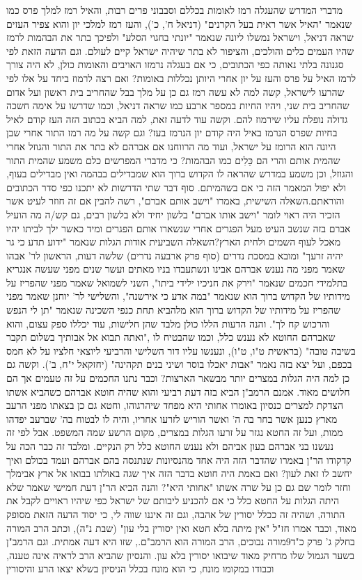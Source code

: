 \documentclass[12pt, openany]{book}
\begin{document}
מדברי המדרש שהעגלה רמז לאומות בכללם וסבבוני פרים רבות, והאיל רמז למלך פרס כמו שנאמר "האיל אשר ראית בעל הקרנים" (דניאל ח', כ'), והעז רמז למלכי יון והוא צפיר העזים שראה דניאל, וישראל נמשלו ליונה שנאמר "יונתי בחגוי הסלע" ולפיכך בתר את הבהמות לרמז שהיו העמים כלים והולכים, והציפור לא בתר שיהיה ישראל קיים לעולם. וגם הדעה הזאת לפי סגנונה בלתי נאותה כפי הכתובים, כי אם בעגלה נרמזו האויבים והאומות כולן, לא היה צורך לרמז האיל על פרס והעז על יון אחרי היותן נכללות באומות? ואם רצה לרמוז ביחד על אלו לפי שהרעו לישראל, קשה למה לא עשה רמז גם כן על מלך בבל שהחריב בית ראשון ועל אדום שהחריב בית שני, ויהיו החיות במספר ארבע כמו שראה דניאל, וכמו שדרשו על אימה חשכה גדולה נופלת עליו שירמוז להם. וקשה עוד לדעה זאת, למה הביא בכתוב הזה העז קודם לאיל בחיות שפרס הנרמז באיל היה קודם יון הנרמז בעז? וגם קשה על מה רמז התור אחרי שבן היונה הוא הרומז על ישראל, ועוד מה הרווחנו אם אברהם לא בתר את התור והגוזל אחרי שהמית אותם והרי הם כַּלִים כמו הבהמות? כי מדברי המפרשים כלם משמע שהמית התור והגוזל, וכן משמע במדרש שהראה לו הקדוש ברוך הוא שמבדילים בבהמה ואין מבדילים בעוף, ולא יפול המאמר הזה כי אם בשהמיתם. סוף דבר שתי הדרשות לא יתכנו כפי סדר הכתובים והוראתם.השאלה השישית, באמרו "וישב אותם אברם", רשה להבין אם זה חוזר לעיט אשר הזכיר היה ראוי לומר "וישב אותו אברם" בלשון יחיד ולא בלשון רבים, גם קש/ה מה הועיל אברם בזה שנשב העיט מעל הפגרים אחרי שנשארו אותם הפגרים ומיד כאשר ילך לביתו יהיו מאכל לעוף השמים ולחית הארץ?השאלה השביעית אודות הגלות שנאמר "ידוע תדע כי גר יהיה זרעך" ומובא במסכת נדרים (סוף פרק ארבעה נדרים) שלשה דעות, הראשון לר' אבהו שאמר מפני מה נענש אברהם אבינו ונשתעבדו בניו מאתים ועשר שנים מפני שעשה אנגריא בתלמידי חכמים שנאמר "וירק את חניכיו ילידי ביתו", השני לשמואל שאמר מפני שהפריז על מידותיו של הקדוש ברוך הוא שנאמר "במה אדע כי אירשנה", והשלישי לר' יוחנן שאמר מפני שהפריז על מידותיו של הקדוש ברוך הוא  מלהביא תחת כנפי השכינה שנאמר "תן לי הנפש והרכוש קח לך". והנה הדעות הללו כולן מלבד שהן חלישות, עוד יכללו ספק עצום, והוא שאברהם החוטא לא נענש כלל, וכמו שהבטיח לו ,"ואתה תבוא אל אבותיך בשלום תקבר בשיבה טובה" (בראשית ט"ו, ט"ו), ונענשו עליו דור השלישי והרביעי ליוצאי חלציו על לא חמס בכפם, ועל יצא בזה נאמר "אבות יאכלו בוסר ושיני בנים תקהינה" (יחזקאל י"ח, ב'). וקשה גם כן למה היה הגלות במצרים יותר מבשאר הארצות? וכבר נתנו החכמים על זה טעמים אך הם חלושים מאוד. אמנם הרמב"ן הביא בזה דעת רביעי והוא שהיה חוטא אברהם כשהביא אשתו הצדקת למצרים כנסיון באומרו אחותי היא מפחד שיהרגוהו, וחטא גם כן בצאתו מפני הרעב מארץ כנען אשר בחר בה ה' ואשר הוריש לזרעו אחריו, והיה לו לבטוח בה' שברעב יפדהו ממות, ועל זה החטא נגזר על זרעו הגלות במצרים, מקום הרשע שמה המשפט. אבל לפי זה נעשנו בני אברהם בעון אביהם ולא נענש החוטא כלל רק הנקיים. ומלבד זה כבר הכה על קדקודו הר"ן באמרו שהדבר הזה היה אחד מהנסיונות שנתנסה בהם אברהם ועמד בכולם ואיך יחשב לו זאת לעון? ואם באמת היה חוטא בדבר הזה איך שגה באולתו בבואו אל ארץ אבימלך וחזר לומר שם גם כן על שרה אשתו "אחותי היא"? והנה הביא הר"ן דעת חמישי שאמר שלא היתה הגלות על החטא כלל כי אם להכניע ליבותם של ישראל כפי שיהיו ראויים לקבל את התורה, ושהיה זה ככלל יסורין של אהבה, וגם זה איננו שווה לי, כי יסוד הדעה הזאת מסופק מאוד, וכבר אמרו חז"ל "אין מיתה בלא חטא ואין יסורין בלי עון" (שבת נ"ה), וכתב הרב המורה בחלק ג' פרק כ"ד9מורה נבוכים, הרב המורה הוא הרמב"ם., שזו היא דעה אמתית. וגם הרמב"ן בשער הגמול שלו מרחיק מאוד שיבואו יסורין בלא עון. והנסיון שהביא הרב לראיה אינה טענה, וכבודו במקומו מונח, כי הוא מונח בכלל הניסיון בשלא יצאו הרע והיסורין 
\end{document}
